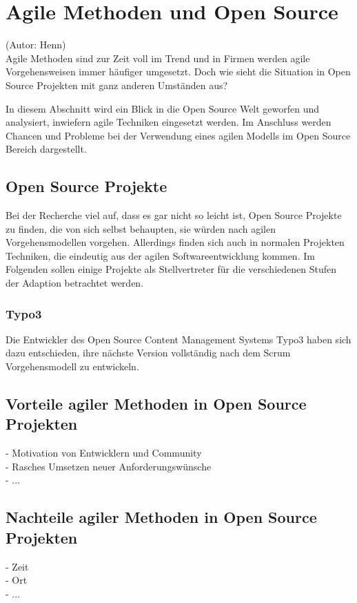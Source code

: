 \section{Agile Methoden und Open Source}
(Autor: Henn)\\
Agile Methoden sind zur Zeit voll im Trend und in Firmen werden agile
Vorgehensweisen immer häufiger umgesetzt. Doch wie sieht die Situation in Open
Source Projekten mit ganz anderen Umständen aus?

In diesem Abschnitt wird ein Blick in die Open Source Welt geworfen und
analysiert, inwiefern agile Techniken eingesetzt werden. Im Anschluss werden
Chancen und Probleme bei der Verwendung eines agilen Modells im Open Source
Bereich dargestellt.


\subsection{Open Source Projekte}
Bei der Recherche viel auf, dass es gar nicht so leicht ist, Open Source
Projekte zu finden, die von sich selbst behaupten, sie würden nach agilen
Vorgehensmodellen vorgehen. Allerdings finden sich auch in normalen Projekten
Techniken, die eindeutig aus der agilen Softwareentwicklung kommen. Im Folgenden
sollen einige Projekte als Stellvertreter für die verschiedenen Stufen der
Adaption betrachtet werden.
\subsubsection{Typo3}
Die Entwickler des Open Source Content Management Systems Typo3 haben sich dazu
entschieden, ihre nächste Version vollständig nach dem Scrum Vorgehensmodell zu
entwickeln. 
\subsection{Vorteile agiler Methoden in Open Source Projekten}
  - Motivation von Entwicklern und Community\\
  - Rasches Umsetzen neuer Anforderungswünsche\\
  - ...
  
\subsection{Nachteile agiler Methoden in Open Source Projekten}
  - Zeit\\
  - Ort\\
  - ...


